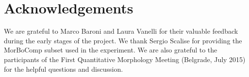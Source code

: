 \documentclass[output=paper]{langsci/langscibook}
\begin{document}
\section*{Acknowledgements}
We are grateful to Marco Baroni and Laura Vanelli for their valuable feedback during the early stages of the project. We thank Sergio Scalise for providing the MorBoComp subset used in the experiment. We are also grateful to the participants of the First Quantitative Morphology Meeting (Belgrade, July 2015) for the helpful questions and discussion.


{\sloppy\printbibliography[heading=subbibliography,notkeyword=this]}
\end{document}
